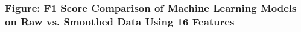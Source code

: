 \documentclass[letterpaper]{article}
\begin{document}
\subsubsection[Figure: F1 Score Comparison of Machine Learning Models on Raw vs. Smoothed Data Using 16
Features]{\textbf{Figure:} F1 Score Comparison of Machine Learning Models on Raw vs. Smoothed Data Using 16 Features}

\bigskip


\bigskip


\bigskip
\end{document}

